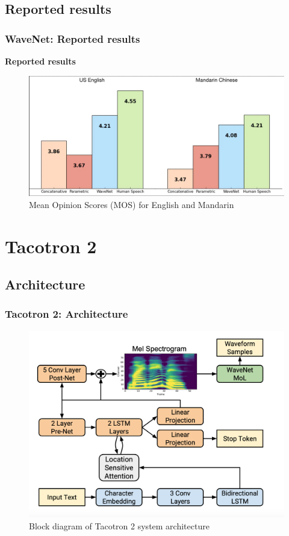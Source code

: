 \documentclass{beamer}
\begin{document}
  \subsection{Reported results}
  \begin{frame}
    \frametitle{WaveNet: Reported results}
    \textbf{Reported results}
    \begin{figure}
      \includegraphics[width=\textwidth]{images/wavenet_mos.png}
      \caption{Mean Opinion Scores (MOS) for English and Mandarin}
    \end{figure}
  \end{frame}

  \section{Tacotron 2}
  \subsection{Architecture}
  \begin{frame}
    \frametitle{Tacotron 2: Architecture}
    \begin{figure}
      \includegraphics[scale=0.25]{images/tacotron_arch.png}
      \caption{Block diagram of Tacotron 2 system architecture}
    \end{figure}
  \end{frame}
\end{document}
